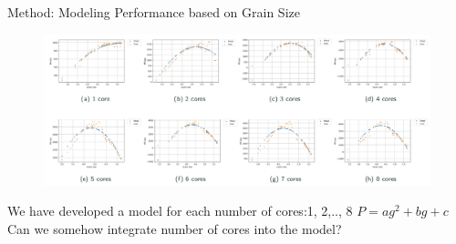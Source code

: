 \documentclass[10pt]{beamer}
\begin{document}
\begin{frame}{Method: Modeling Performance based on Grain Size}
	\begin{outline}	
		\begin{figure}
		\includegraphics[scale=.15]{images/polyfit/model_1_8.png}
		\end{figure}

		\1We have developed a model for each number of cores:1, 2,.., 8 $P=ag^2+bg+c$\\ 
		\pause
		\1Can we somehow integrate number of cores into the model?
	\end{outline}
\end{frame}
\end{document}
